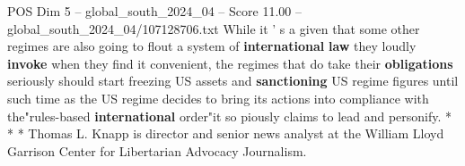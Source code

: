 \begin{textsample}{POS Dim 5 – global\_south\_2024\_04 – Score 11.00 – global\_south\_2024\_04/107128706.txt}
While it ' s a given that some other regimes are also going to flout a system of \textbf{international} \textbf{law} they loudly \textbf{invoke} when they find it convenient, the regimes that do take their \textbf{obligations} seriously should start freezing US assets and \textbf{sanctioning} US regime figures until such time as the US regime decides to bring its actions into compliance with the"rules-based \textbf{international} order"it so piously claims to lead and personify. * * * Thomas L.
Knapp is director and senior news analyst at the William Lloyd Garrison Center for Libertarian Advocacy Journalism.

\end{textsample}
